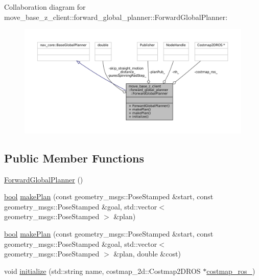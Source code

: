 Collaboration diagram for move\+\_\+base\+\_\+z\+\_\+client\+:\+:forward\+\_\+global\+\_\+planner\+:\+:Forward\+Global\+Planner\+:
\nopagebreak
\begin{figure}[H]
\begin{center}
\leavevmode
\includegraphics[width=350pt]{classmove__base__z__client_1_1forward__global__planner_1_1ForwardGlobalPlanner__coll__graph}
\end{center}
\end{figure}
\subsection*{Public Member Functions}
\begin{DoxyCompactItemize}
\item 
\hyperlink{classmove__base__z__client_1_1forward__global__planner_1_1ForwardGlobalPlanner_a9bbdde743629802b247441b8e955e114}{Forward\+Global\+Planner} ()
\item 
\hyperlink{classbool}{bool} \hyperlink{classmove__base__z__client_1_1forward__global__planner_1_1ForwardGlobalPlanner_a2dcf9aad74efaaa92ee78650f7a23096}{make\+Plan} (const geometry\+\_\+msgs\+::\+Pose\+Stamped \&start, const geometry\+\_\+msgs\+::\+Pose\+Stamped \&goal, std\+::vector$<$ geometry\+\_\+msgs\+::\+Pose\+Stamped $>$ \&plan)
\item 
\hyperlink{classbool}{bool} \hyperlink{classmove__base__z__client_1_1forward__global__planner_1_1ForwardGlobalPlanner_a16f21fc4735c26535517678d29a6f1f3}{make\+Plan} (const geometry\+\_\+msgs\+::\+Pose\+Stamped \&start, const geometry\+\_\+msgs\+::\+Pose\+Stamped \&goal, std\+::vector$<$ geometry\+\_\+msgs\+::\+Pose\+Stamped $>$ \&plan, double \&cost)
\item 
void \hyperlink{classmove__base__z__client_1_1forward__global__planner_1_1ForwardGlobalPlanner_aed754f82f2907720ed1410bb00922bf4}{initialize} (std\+::string name, costmap\+\_\+2d\+::\+Costmap2\+D\+R\+OS $\ast$\hyperlink{classmove__base__z__client_1_1forward__global__planner_1_1ForwardGlobalPlanner_aba11d85f5f4c9370873195ca97497a22}{costmap\+\_\+ros\+\_\+})
\end{DoxyCompactItemize}
